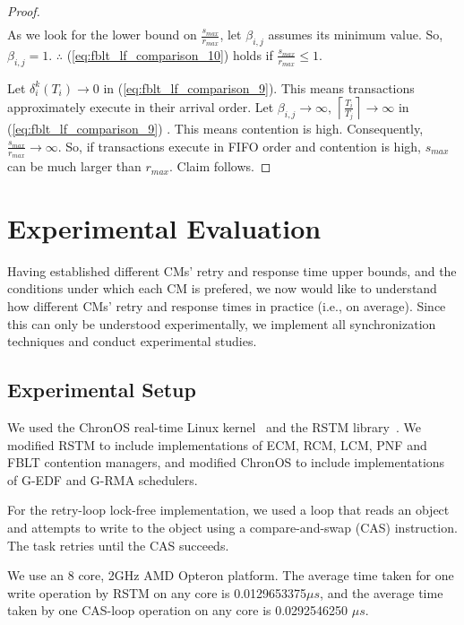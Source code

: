 \documentclass[a4paper,english]{article}
\newtheorem{proof}{Proof}
\begin{document}
\begin{proof}
\begin{eqnarray}
\end{eqnarray}
As we look for the lower bound on $\frac{s_{max}}{r_{max}}$, let
$\beta_{i,j}$ assumes its minimum value. So, $\beta_{i,j}=1$. $\therefore$
(\ref{eq:fblt_lf_comparison_10}) holds if $\frac{s_{max}}{r_{max}}\le1$.

Let $\delta_{i}^{k}(T_{i})\rightarrow0$ in (\ref{eq:fblt_lf_comparison_9}).
This means transactions approximately execute in their arrival order.
Let $\beta_{i,j}\rightarrow\infty,\,\left\lceil \frac{T_{i}}{T_{j}}\right\rceil \rightarrow\infty$
in (\ref{eq:fblt_lf_comparison_9}) . This means contention is high.
Consequently, $\frac{s_{max}}{r_{max}}\rightarrow\infty$. So, if
transactions execute in FIFO order and contention is high, $s_{max}$
can be much larger than $r_{max}$. Claim follows.

\end{proof}


\section{Experimental Evaluation}\label{exp_eval}

Having established different CMs' retry and response time upper bounds, and the conditions under which each CM is prefered, we now would like to understand how different CMs' retry and response times in practice (i.e., on average). Since this can only be understood experimentally, we implement all synchronization techniques and conduct experimental studies. 

\subsection{Experimental Setup}
We used the ChronOS real-time Linux kernel~\cite{dellinger2011chronos}
and the RSTM library~\cite{marathe2006lowering}. We modified RSTM to include implementations of ECM, RCM, LCM, PNF and FBLT contention managers, and modified ChronOS to include implementations of G-EDF and G-RMA schedulers. 

For the retry-loop lock-free implementation,
we used a loop that reads an object and attempts to write to the object using a compare-and-swap (CAS) instruction. The task retries until the CAS succeeds. 

We use an 8 core, 2GHz AMD Opteron platform. The average time
taken for one write operation by RSTM on any
core is 0.0129653375$\mu s$, and the average time taken
by one CAS-loop operation on any core is 0.0292546250 $\mu s$.
\end{document}
